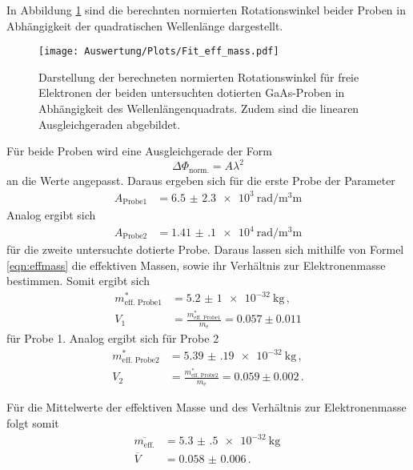 In Abbildung \ref{fig:beideProben} sind die berechnten normierten Rotationswinkel beider Proben in
Abhängigkeit der quadratischen Wellenlänge dargestellt.
\begin{figure}[H]
  \centering
  \texttt{[image: Auswertung/Plots/Fit\_eff\_mass.pdf]}
  \caption{Darstellung der berechneten normierten Rotationswinkel für freie Elektronen der beiden untersuchten
  dotierten GaAs-Proben in Abhängigkeit des Wellenlängenquadrats. Zudem sind die linearen
  Ausgleichgeraden abgebildet.}
  \label{fig:beideProben}
\end{figure} \noindent
Für beide Proben wird eine Ausgleichgerade der
Form
\begin{equation*}
  \Delta \Phi_\text{norm.} = A \lambda^2
\end{equation*} \noindent
an die Werte angepasst. Daraus ergeben sich für die erste Probe der Parameter
\begin{align*}
  A_\text{Probe1} &= \SI{6.5(23)e3}{\radian\per\cubic\milli\meter}
\end{align*} \noindent
Analog ergibt sich
\begin{align*}
  A_\text{Probe2} &= \SI{1.41(10)e4}{\radian\per\cubic\milli\meter}
\end{align*} \noindent
für die zweite untersuchte dotierte Probe. Daraus lassen sich mithilfe von Formel \eqref{eqn:effmass}
die effektiven Massen, sowie ihr Verhältnis zur Elektronenmasse bestimmen. Somit ergibt sich
\begin{align*}
  m_\text{eff. Probe1}^* &= \SI{5.2(10)e-32}{\kilo\gram}\, , \\
  V_1 &= \frac{m_\text{eff. Probe1}^*}{m_\text{e}} = 0.057 \pm 0.011
\end{align*}
für Probe 1. Analog ergibt sich für Probe 2
\begin{align*}
  m_\text{eff. Probe2}^* &= \SI{5.39(19)e-32}{\kilo\gram} \, , \\
  V_2 &= \frac{m_\text{eff. Probe2}^*}{m_\text{e}} = 0.059 \pm 0.002 \,.
\end{align*} \noindent

Für die Mittelwerte der effektiven Masse und des Verhältnis zur Elektronenmasse folgt somit
\begin{align}
  \overline{m_\text{eff.}} &= \SI{5.3(5)e-32}{\kilo\gram} \nonumber \, \\
  \overline{V} &= \num{0.058(6)} \, .
  \label{eqn:V_eff}
\end{align}
